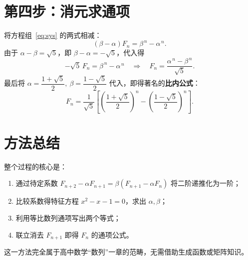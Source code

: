 \documentclass[12pt,a4paper]{ctexart}
\begin{document}
\section*{第四步：消元求通项}
将方程组~\eqref{eq:sys} 的两式相减：
\[
(\beta-\alpha)F_n = \beta^{\,n} - \alpha^{\,n}.
\]
由于 $\alpha-\beta=\sqrt5$，即 $\beta-\alpha=-\sqrt5$，代入得
\[
-\sqrt5\,F_n = \beta^{\,n} - \alpha^{\,n}
\quad\Longrightarrow\quad
F_n = \frac{\alpha^{\,n} - \beta^{\,n}}{\sqrt5}.
\]
最后将 $\alpha=\dfrac{1+\sqrt5}{2},\ \beta=\dfrac{1-\sqrt5}{2}$ 代入，即得著名的\textbf{比内公式}：
\[
\boxed{F_n = \frac{1}{\sqrt5}\left[\left(\frac{1+\sqrt5}{2}\right)^{\!n} - \left(\frac{1-\sqrt5}{2}\right)^{\!n}\right]}.
\]

\section*{方法总结}
整个过程的核心是：
\begin{enumerate}
  \item 通过待定系数 $F_{n+2}-\alpha F_{n+1}=\beta(F_{n+1}-\alpha F_n)$ 将二阶递推化为一阶；
  \item 比较系数得特征方程 $x^2-x-1=0$，求出 $\alpha,\beta$；
  \item 利用等比数列通项写出两个等式；
  \item 联立消去 $F_{n+1}$ 即得 $F_n$ 的通项公式。
\end{enumerate}
这一方法完全属于高中数学“数列”一章的范畴，无需借助生成函数或矩阵知识。
\end{document}
